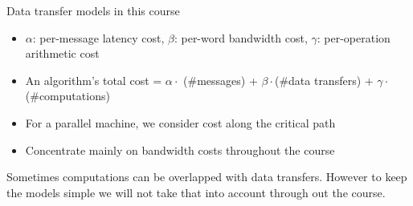 \documentclass[
	12pt, %
]{beamer}
\begin{document}
\begin{frame}{Data transfer models in this course}
\begin{minipage}{0.45\linewidth}
\begin{center}
\begin{figure}
			
		\end{figure}
	\end{center}
\end{minipage}
\vfill
\begin{itemize}
	\item $\alpha$: per-message latency cost, $\beta$: per-word bandwidth cost, $\gamma$: per-operation arithmetic cost
	\item An algorithm's total cost = $\alpha \cdot$ (\#messages) + $\beta\cdot$(\#data transfers) + $\gamma \cdot$ (\#computations)
	\item For a parallel machine, we consider cost along the critical path
	\item Concentrate mainly on bandwidth costs throughout the course
\end{itemize}
\vfill
{\footnotesize Sometimes computations can be overlapped with data transfers. However to keep the models simple we will not take that into account through out the course.} 

\end{frame}
\end{document}

